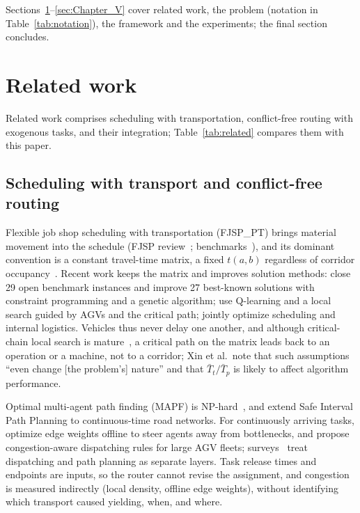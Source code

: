 \documentclass[preprint,review,12pt,authoryear,doubleblind]{elsarticle}
\begin{document}
Sections~\ref{sec:Chapter_II}--\ref{sec:Chapter_V} cover related work, the problem (notation in Table~\ref{tab:notation}), the framework and the experiments; the final section concludes.


\section{Related work}
\label{sec:Chapter_II}

Related work comprises scheduling with transportation, conflict-free routing with exogenous tasks, and their integration; Table~\ref{tab:related} compares them with this paper.

\subsection{Scheduling with transport and conflict-free routing}

Flexible job shop scheduling with transportation (FJSP\_PT) brings material movement into the schedule (FJSP review~\citep{dauzereperes2024fjsp}; benchmarks~\citep{homayouni2021production}), and its dominant convention is a constant travel-time matrix, a fixed $t(a,b)$ regardless of corridor occupancy~\citep{xin2025review}.
Recent work keeps the matrix and improves solution methods: \citet{meng2025cp} close 29 open benchmark instances and improve 27 best-known solutions with constraint programming and a genetic algorithm; \citet{qin2026knowledge} use Q-learning and a local search guided by AGVs and the critical path; \citet{jafarian2026integrated} jointly optimize scheduling and internal logistics.
Vehicles thus never delay one another, and although critical-chain local search is mature~\citep{otala2021graph,tamssaouet2023neighborhood}, a critical path on the matrix leads back to an operation or a machine, not to a corridor; Xin et al.\ note that such assumptions ``even change [the problem's] nature'' and that $\bar{T}_t/\bar{T}_p$ is likely to affect algorithm performance.

Optimal multi-agent path finding (MAPF) is NP-hard~\citep{gao2023mapf}, and \citet{kasaura2022sipp} extend Safe Interval Path Planning to continuous-time road networks.
For continuously arriving tasks, \citet{zhang2024guidance} optimize edge weights offline to steer agents away from bottlenecks, and \citet{kim2026congestion} propose congestion-aware dispatching rules for large AGV fleets; surveys~\citep{lu2022agv,fragapane2021planning} treat dispatching and path planning as separate layers.
Task release times and endpoints are inputs, so the router cannot revise the assignment, and congestion is measured indirectly (local density, offline edge weights), without identifying which transport caused yielding, when, and where.
\end{document}
